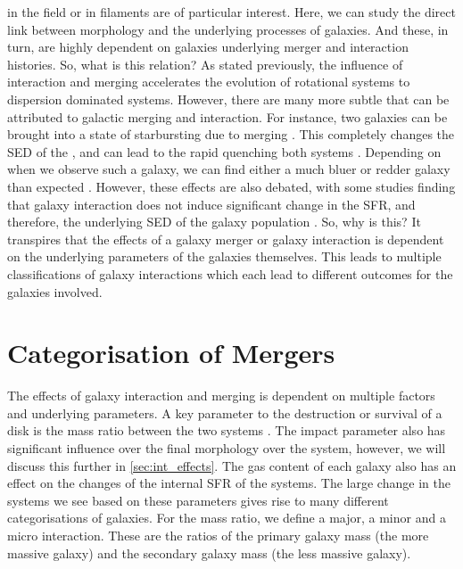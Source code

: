 \DIFdelbegin {}\DIFdelend \DIFaddbegin {}\DIFaddend in the field or in filaments are of particular interest. Here, we can study the direct link between morphology and the underlying processes of galaxies. And these, in turn, are highly dependent on galaxies underlying merger and interaction histories. So, what is this relation? As stated previously, the influence of interaction and merging accelerates the evolution of rotational systems to dispersion dominated systems. However, there are many more subtle \DIFdelbegin {}\DIFdelend \DIFaddbegin {}\DIFaddend that can be attributed to galactic merging and interaction. For instance, \DIFdelbegin {}\DIFdelend two galaxies can be brought into a state of starbursting due to merging \citep{2008MNRAS.385L..38M}. This completely changes the \DIFdelbegin {}\DIFdelend SED of the \DIFdelbegin {}\DIFdelend \DIFaddbegin {}\DIFaddend , and can lead to the rapid quenching both systems \citep{2018MNRAS.476.2591V, 2022MNRAS.517L..92E}. Depending on when we observe such a galaxy, we can find either a much bluer or redder galaxy than expected \citep{2007A&A...468...61D}. However, these effects are also debated, with some studies finding that galaxy interaction does not induce significant change in the SFR, and therefore, the underlying SED of the galaxy population \citep{2003A&A...405...31B}. So, why is this? It transpires that the effects of a galaxy merger or galaxy interaction is dependent on the underlying parameters of the galaxies themselves. This leads to multiple classifications of galaxy interactions which each lead to different outcomes for the galaxies involved. 

\section{Categorisation of Mergers}
\noindent The effects of galaxy interaction and merging is dependent on multiple factors and underlying parameters. A key parameter to the destruction or survival of a disk is the mass ratio between the two systems \citep{2005A&A...437...69B, 2008MNRAS.384..386C}. The impact parameter also has significant influence over the final morphology over the system, however, we will discuss this further in \DIFdelbegin {}\DIFdelend \DIFaddbegin {}\DIFaddend \ref{sec:int_effects}. The gas content of each galaxy also has an effect on the changes of the internal SFR of the systems. The large change in the systems we see based on these parameters gives rise to many different categorisations of galaxies. For the mass ratio, we define a major, a minor and a micro interaction. These are the ratios of the primary galaxy mass (the more massive galaxy) and the secondary galaxy mass (the less massive galaxy). 

